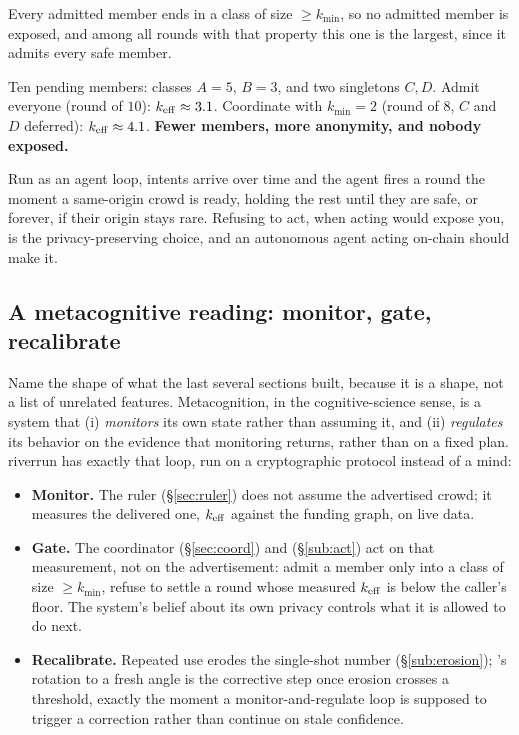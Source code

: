 \documentclass[11pt]{article}
\begin{document}
\begin{property}
Every admitted member ends in a class of size $\geq k_{\min}$, so no admitted member is
exposed, and among all rounds with that property this one is the largest, since it
admits every safe member.
\end{property}

\begin{measured}
Ten pending members: classes $A{=}5$, $B{=}3$, and two singletons $C,D$. Admit everyone
(round of $10$): $k_{\mathrm{eff}} \approx 3.1$. Coordinate with $k_{\min}{=}2$ (round of $8$, $C$
and $D$ deferred): $k_{\mathrm{eff}} \approx 4.1$. \textbf{Fewer members, more anonymity, and nobody
exposed.}
\end{measured}

Run as an agent loop, intents arrive over time and the agent fires a round the moment a
same-origin crowd is ready, holding the rest until they are safe, or forever, if their
origin stays rare. Refusing to act, when acting would expose you, is the
privacy-preserving choice, and an autonomous agent acting on-chain should make it.

\subsection{A metacognitive reading: monitor, gate, recalibrate}
\label{sub:metacog}

Name the shape of what the last several sections built, because it is a shape, not a
list of unrelated features. Metacognition, in the cognitive-science sense, is a system
that (i) \emph{monitors} its own state rather than assuming it, and (ii) \emph{regulates}
its behavior on the evidence that monitoring returns, rather than on a fixed plan. riverrun
has exactly that loop, run on a cryptographic protocol instead of a mind:

\begin{itemize}
\item \textbf{Monitor.} The ruler (\S\ref{sec:ruler}) does not assume the advertised
crowd; it measures the delivered one, $k_{\mathrm{eff}}$ against the funding graph, on live data.
\item \textbf{Gate.} The coordinator (\S\ref{sec:coord}) and  (\S\ref{sub:act})
act on that measurement, not on the advertisement: admit a member only into a class of
size $\geq k_{\min}$, refuse to settle a round whose measured $k_{\mathrm{eff}}$ is below the
caller's floor. The system's belief about its own privacy controls what it is allowed to
do next.
\item \textbf{Recalibrate.} Repeated use erodes the single-shot number
(\S\ref{sub:erosion}); \river's rotation to a fresh angle is the corrective step once
erosion crosses a threshold, exactly the moment a monitor-and-regulate loop is supposed to
trigger a correction rather than continue on stale confidence.
\end{itemize}
\end{document}
